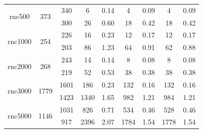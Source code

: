 \documentclass[10pt,journal]{IEEEtran}
\begin{document}
\begin{table}[!h]
\begin{tabular}{c|c|c|c|c|c|c|c|c}
\hline
\multicolumn{1}{c|}{\multirow{2}{*}{\hspace*{-0.5em}rnc500\hspace*{-0.5em}}}            &\multicolumn{1}{c|}{\multirow{2}{*}{373}}    &340   &6  &0.14  &4  &0.09   &4  &0.09   \\
  &     &300  &26  &0.60  &18   &0.42  &18  &0.42 \\

\hline
\multicolumn{1}{c|}{\multirow{2}{*}{\hspace*{-1em}rnc1000\hspace*{-1em}}}              &\multicolumn{1}{c|}{\multirow{2}{*}{254}}   &226    &16 &0.23   &12   &0.17 &12   &0.17  \\
   &     &203   &86  &1.23  &64  &0.91  &62  &0.88 \\

\hline
\multicolumn{1}{c|}{\multirow{2}{*}{\hspace*{-1em}rnc2000\hspace*{-1em}}}            &\multicolumn{1}{c|}{\multirow{2}{*}{268}}    &243    &14  &0.14  &8   &0.08  &8 &0.08   \\
  &    &219   &52  &0.53  &38    &0.38  &38 &0.38  \\

\hline
\multicolumn{1}{c|}{\multirow{2}{*}{\hspace*{-1em}rnc3000\hspace*{-1em}}}           &\multicolumn{1}{c|}{\multirow{2}{*}{\hspace*{-1em}1779\hspace*{-1em}}}  &1601  &186  &0.23  &132   &0.16   &\hspace*{-1em}132\hspace*{-1em}   &0.16  \\
   &     &1423   &\hspace*{-1em}1340\hspace*{-1em}  &1.65   &982   &1.21   &984  &1.21 \\

\hline
\multicolumn{1}{c|}{\multirow{2}{*}{\hspace*{-1em}rnc5000\hspace*{-1em}}}           &\multicolumn{1}{c|}{\multirow{2}{*}{\hspace*{-1em}1146\hspace*{-1em}}}    &1031  &826  &0.71  &534  &0.46   &\hspace*{-1em}528\hspace*{-1em}  &0.46     \\
   &     &917   &\hspace*{-1em}2396\hspace*{-1em}   &2.07   &\hspace*{-1em}1784\hspace*{-1em}   &1.54   &\hspace*{-1em}1778\hspace*{-1em}  &1.54  \\


\end{tabular}
\end{table}
\end{document}
